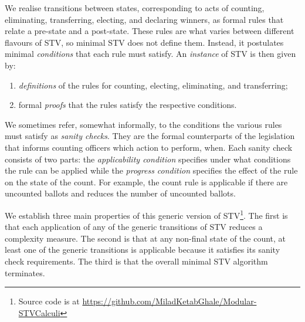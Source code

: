 \documentclass{llncs}
\begin{document}
We realise transitions between states, corresponding to acts of counting,
eliminating, transferring, electing, and declaring winners,
as formal rules that relate a pre-state and a
post-state. These rules are what varies between different flavours
of STV,
so
minimal STV does not define them.
Instead, it
postulates minimal \emph{conditions} that each rule must
satisfy. An \emph{instance} of STV is then given by:
\begin{enumerate}
\item \emph{definitions} of the rules for counting, electing,
eliminating, and transferring;
\item formal \emph{proofs} that the rules satisfy the respective
conditions.
\end{enumerate}

\noindent
We sometimes refer, somewhat informally, to the conditions the various rules must
satisfy as \emph{sanity checks}. They are the
formal counterparts of the legislation that informs counting officers
which action to perform, when. 
Each sanity check consists of two parts: 
the \emph{applicability condition}
specifies under what conditions the rule can be applied while
the \emph{progress condition} specifies the effect of the
rule on the state of the count.
For example, the count rule is applicable 
if there are uncounted ballots and reduces
the number of uncounted ballots.

We establish
three  main properties of this generic version of STV\footnote{Source code is at  \url{https://github.com/MiladKetabGhale/Modular-STVCalculi}}. The first
is that each application of any of the generic transitions
of STV 
reduces a complexity measure. The second is that at any
non-final state of the count, at least one of the generic
transitions is applicable because it satisfies its sanity
check requirements. The third is that the overall 
minimal STV algorithm terminates. 
\end{document}
